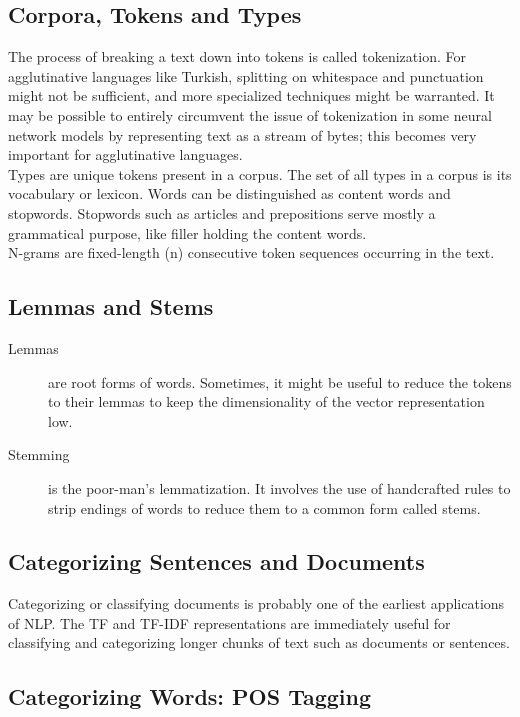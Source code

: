 \documentclass[french]{article}
\begin{document}
\subsection{Corpora, Tokens and Types}

The process of breaking a text down into tokens is called tokenization. For agglutinative languages like Turkish, splitting on whitespace and punctuation might not be sufficient, and more specialized techniques might be warranted. It may be possible to entirely circumvent the issue of tokenization in some neural network models by representing text as a stream of bytes; this becomes very important for agglutinative languages.\\

Types are unique tokens present in a corpus. The set of all types in a corpus is its vocabulary or lexicon. Words can be distinguished as content words and stopwords.  Stopwords such as articles and prepositions serve mostly a grammatical purpose, like filler holding the content words.\\

N-grams are fixed-length (n) consecutive token sequences occurring in the text.

\subsection{Lemmas and Stems}

\begin{description}
\item [Lemmas] are root forms of words. Sometimes, it might be useful to reduce the tokens to their lemmas to keep the dimensionality of the vector representation low.
\item [Stemming] is the poor-man’s lemmatization. It involves the use of handcrafted rules to strip endings of words to reduce them to a common form called stems.
\end{description}

\subsection{Categorizing Sentences and Documents}

Categorizing or classifying documents is probably one of the earliest applications of NLP. The TF and TF-IDF representations are immediately useful for classifying and categorizing longer chunks of text such as documents or sentences.

\subsection{Categorizing Words: POS Tagging}
\end{document}

